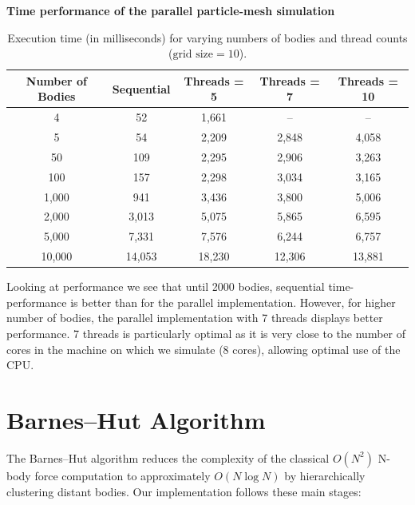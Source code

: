 \documentclass{article}
\begin{document}
\textbf{Time performance of the parallel particle-mesh simulation}
\begin{table}[htbp]
\centering
\begin{tabular}{|c|c|c|c|c|}
\hline
\textbf{Number of Bodies} & \textbf{Sequential} & \textbf{Threads = 5} & \textbf{Threads = 7} & \textbf{Threads = 10} \\
\hline
4      & 52    & 1,661  & --    & --     \\
5      & 54    & 2,209  & 2,848  & 4,058   \\
50     & 109   & 2,295  & 2,906  & 3,263   \\
100    & 157   & 2,298  & 3,034  & 3,165   \\
1,000  & 941   & 3,436  & 3,800  & 5,006   \\
2,000  & 3,013  & 5,075  & 5,865  & 6,595   \\
5,000  & 7,331  & 7,576  & 6,244  & 6,757   \\
10,000 & 14,053  & 18,230 & 12,306 & 13,881  \\
\hline
\end{tabular}
\caption{Execution time (in milliseconds) for varying numbers of bodies and thread counts ($\text{grid size} = 10$).}
\label{tab:thread_performance}
\end{table}

Looking at performance we see that until 2000 bodies, sequential time-performance is better than for the parallel implementation. However, for higher number of bodies, the parallel implementation with 7 threads displays better performance. 7 threads is particularly optimal as it is very close to the number of cores in the machine on which we simulate (8 cores), allowing optimal use of the CPU.  



\section{Barnes–Hut Algorithm}

The Barnes–Hut algorithm reduces the complexity of the classical \(O(N^2)\) N-body force computation to approximately \(O(N\log N)\) by hierarchically clustering distant bodies.  Our implementation follows these main stages:
\end{document}
